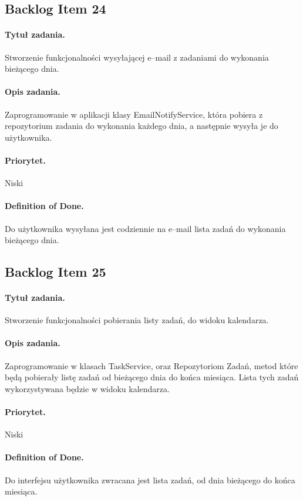 \documentclass[a4paper]{article}
\begin{document}
\subsection{Backlog Item 24} 
\paragraph{Tytuł zadania.} Stworzenie funkcjonalności wysyłającej e--mail z zadaniami do wykonania bieżącego dnia.
\paragraph{Opis zadania.} Zaprogramowanie w aplikacji klasy EmailNotifyService, która pobiera z repozytorium zadania do wykonania każdego dnia, a następnie wysyła je do użytkownika.
\paragraph{Priorytet.} Niski
\paragraph{Definition of Done.} Do użytkownika wysyłana jest codziennie na e--mail lista zadań do wykonania bieżącego dnia.


\subsection{Backlog Item 25} 
\paragraph{Tytuł zadania.}  Stworzenie funkcjonalności pobierania listy zadań, do widoku kalendarza.
\paragraph{Opis zadania.} Zaprogramowanie w klasach TaskService, oraz Repozytoriom Zadań, metod które będą pobierały listę zadań od bieżącego dnia do końca miesiąca. Lista tych zadań wykorzystywana będzie w widoku kalendarza.
\paragraph{Priorytet.} Niski
\paragraph{Definition of Done.} Do interfejsu użytkownika zwracana jest lista zadań, od dnia bieżącego do końca miesiąca. 
\end{document}
